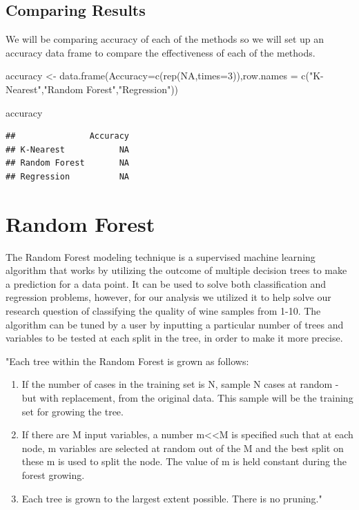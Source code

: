 \documentclass[
]{book}
\newenvironment{Shaded}{\begin{snugshade}}{\end{snugshade}}
\newcommand{\AttributeTok}[1]{\textcolor[rgb]{0.77,0.63,0.00}{#1}}
\newcommand{\ConstantTok}[1]{\textcolor[rgb]{0.00,0.00,0.00}{#1}}
\newcommand{\DecValTok}[1]{\textcolor[rgb]{0.00,0.00,0.81}{#1}}
\newcommand{\FunctionTok}[1]{\textcolor[rgb]{0.00,0.00,0.00}{#1}}
\newcommand{\NormalTok}[1]{#1}
\newcommand{\OtherTok}[1]{\textcolor[rgb]{0.56,0.35,0.01}{#1}}
\newcommand{\StringTok}[1]{\textcolor[rgb]{0.31,0.60,0.02}{#1}}
\providecommand{\tightlist}{%
  \setlength{\itemsep}{0pt}\setlength{\parskip}{0pt}}
\begin{document}
\hypertarget{comparing-results}{%
\section{Comparing Results}\label{comparing-results}}

We will be comparing accuracy of each of the methods so we will set up an accuracy data frame to compare the effectiveness of each of the methods.

\begin{Shaded}
\begin{Highlighting}[]
\NormalTok{accuracy }\OtherTok{\textless{}{-}} \FunctionTok{data.frame}\NormalTok{(}\AttributeTok{Accuracy=}\FunctionTok{c}\NormalTok{(}\FunctionTok{rep}\NormalTok{(}\ConstantTok{NA}\NormalTok{,}\AttributeTok{times=}\DecValTok{3}\NormalTok{)),}\AttributeTok{row.names =} \FunctionTok{c}\NormalTok{(}\StringTok{"K{-}Nearest"}\NormalTok{,}\StringTok{"Random Forest"}\NormalTok{,}\StringTok{"Regression"}\NormalTok{))}

\NormalTok{accuracy}
\end{Highlighting}
\end{Shaded}

\begin{verbatim}
##               Accuracy
## K-Nearest           NA
## Random Forest       NA
## Regression          NA
\end{verbatim}

\hypertarget{random-forest}{%
\chapter{Random Forest}\label{random-forest}}

The Random Forest modeling technique is a supervised machine learning algorithm that works by utilizing the outcome of multiple decision trees to make a prediction for a data point. It can be used to solve both classification and regression problems, however, for our analysis we utilized it to help solve our research question of classifying the quality of wine samples from 1-10. The algorithm can be tuned by a user by inputting a particular number of trees and variables to be tested at each split in the tree, in order to make it more precise.

"Each tree within the Random Forest is grown as follows:

\begin{enumerate}
\def\labelenumi{\arabic{enumi}.}
\tightlist
\item
  If the number of cases in the training set is N, sample N cases at random - but with replacement, from the original data. This sample will be the training set for growing the tree.
\item
  If there are M input variables, a number m\textless\textless M is specified such that at each node, m variables are selected at random out of the M and the best split on these m is used to split the node. The value of m is held constant during the forest growing.
\item
  Each tree is grown to the largest extent possible. There is no pruning." \citet{random_forests}
\end{enumerate}
\end{document}
